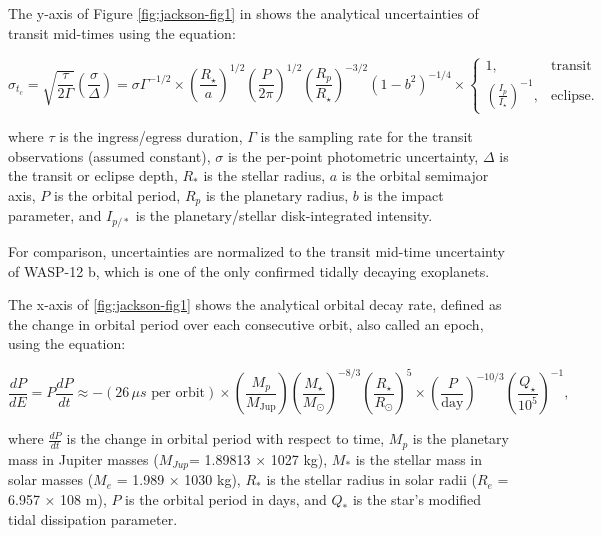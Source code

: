 \documentclass[oneside,12pt]{amsart}
\numberwithin{page}{section}
\begin{document}
The y-axis of Figure \ref{fig:jackson-fig1} in \citet{jackson2023metrics} shows the analytical uncertainties of transit mid-times using the equation:

\begin{equation}
    \sigma_{t_c} = \sqrt{\frac{\tau}{2\Gamma}} \left(\frac{\sigma}{\Delta}\right) = \sigma \Gamma^{-1/2}
    \times \left( \frac{R_\star}{a} \right)^{1/2} \left( \frac{P}{2\pi} \right)^{1/2} 
    \left( \frac{R_p}{R_\star} \right)^{-3/2} (1 - b^2)^{-1/4} 
    \times \begin{cases}
    1, & \text{transit} \\
    \left(\frac{I_p}{I_\star}\right)^{-1}, & \text{eclipse}.
    \end{cases}
    \label{eq:analytical_transit_uncertainties}
\end{equation}

where $\tau$ is the ingress/egress duration, $\Gamma$ is the sampling rate for the transit observations (assumed constant), $\sigma$ is the per-point photometric uncertainty, $\Delta$ is the transit or eclipse depth, $R_{*}$ is the stellar radius, $a$ is the orbital semimajor axis, $P$ is the orbital period, $R_{p}$ is the planetary radius, $b$ is the impact parameter, and $I_{p/*}$ is the planetary/stellar disk-integrated intensity. 

For comparison, uncertainties are normalized to the transit mid-time uncertainty of WASP-12 b, which is one of the only confirmed tidally decaying exoplanets. 

The x-axis of \ref{fig:jackson-fig1} shows the analytical orbital decay rate, defined as the change in orbital period over each consecutive orbit, also called an epoch, using the equation: 

\begin{equation}
    \frac{dP}{dE} = P \frac{dP}{dt} \approx - (26 \, \mu s \text{ per orbit})
    \times \left( \frac{M_p}{M_{\text{Jup}}} \right)
    \left( \frac{M_\star}{M_\odot} \right)^{-8/3}
    \left( \frac{R_\star}{R_\odot} \right)^{5}
    \times \left( \frac{P}{\text{day}} \right)^{-10/3}
    \left( \frac{Q_\star}{10^5} \right)^{-1},
    \label{eq:orbital_period_rate_of_change}
\end{equation}

where $\frac{dP}{dt}$ is the change in orbital period with respect to time, $M_p$ is the planetary mass in Jupiter masses ($M_{Jup}$=
1.89813 × 1027 kg), $M_*$ is the stellar mass in solar masses
($M_e$ = 1.989 × 1030 kg), $R_*$ is the stellar radius in solar radii ($R_e$ = 6.957 × 108 m), $P$ is the orbital period in days, and $Q_*$ is the star’s modified tidal dissipation parameter.
\end{document}
